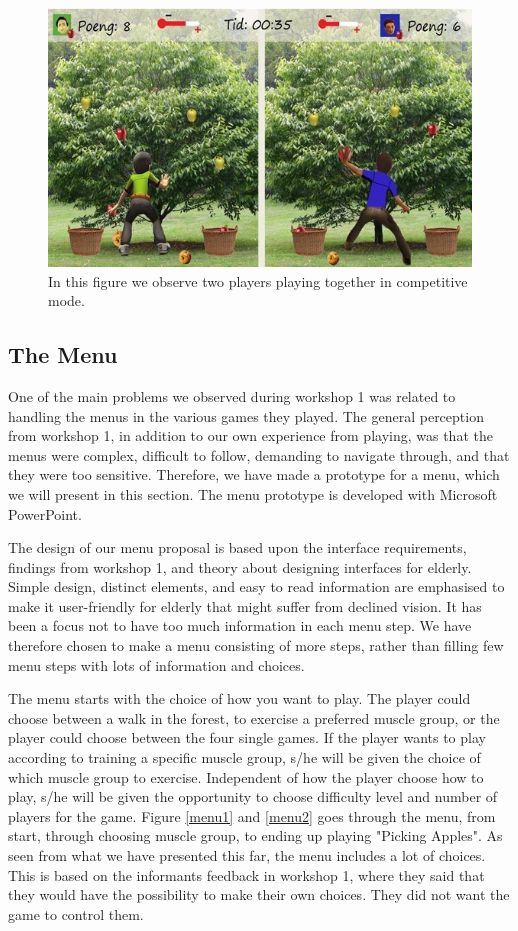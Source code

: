\begin{figure} [H]
\centering
\includegraphics[scale=0.8]{multiplayereple.jpg}
\caption[Picking apples - multi player]{In this figure we observe two players playing together in competitive mode.}
\label{fig:appleMultiplayer}
\end{figure}

\subsection{The Menu}
\label{sec:menu}

One of the main problems we observed during workshop 1 was related to handling the menus in the various games they played. The general perception from workshop 1, in addition to our own experience from playing, was that the menus were complex, difficult to follow, demanding to navigate through, and that they were too sensitive. Therefore, we have made a prototype for a menu, which we will present in this section. The menu prototype is developed with Microsoft PowerPoint.

The design of our menu proposal is based upon the interface requirements, findings from workshop 1, and theory about designing interfaces for elderly. Simple design, distinct elements, and easy to read information are emphasised to make it user-friendly for elderly that might suffer from declined vision. It has been a focus not to have too much information in each menu step. We have therefore chosen to make a menu consisting of more steps, rather than filling few menu steps with lots of information and choices.   

The menu starts with the choice of how you want to play. The player could choose between a walk in the forest, to exercise a preferred muscle group, or the player could choose between the four single games. If the player wants to play according to training a specific muscle group, s/he will be given the choice of which muscle group to exercise. Independent of how the player choose how to play, s/he will be given the opportunity to choose difficulty level and number of players for the game. Figure \ref{menu1} and \ref{menu2} goes through the menu, from start, through choosing muscle group, to ending up playing "Picking Apples". As seen from what we have presented this far, the menu includes a lot of choices. This is based on the informants feedback in workshop 1, where they said that they would have the possibility to make their own choices. They did not want the game to control them.   

